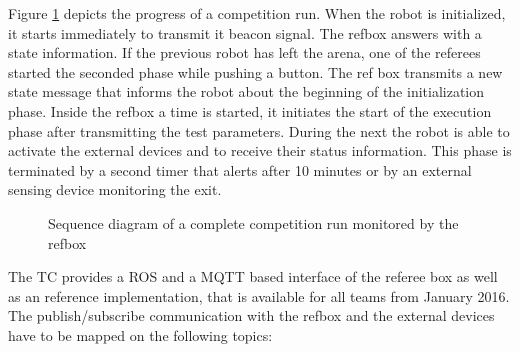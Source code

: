Figure \ref{fig:refbox} depicts the progress of a competition run. When the robot is initialized, it starts immediately to transmit it beacon signal. The refbox answers with a state information. If the previous robot has left the arena, one of the referees started the seconded phase while pushing a button. The ref box transmits a new state message that informs the robot about the beginning of the initialization phase. Inside the refbox a time is started, it initiates the start of the execution phase after transmitting the test parameters. During the next  the robot is able to activate the external devices and to receive their status information. This phase is terminated by a second timer that alerts after 10 minutes or by an external sensing device monitoring the exit.

\begin{figure}
\centering

\caption{Sequence diagram of a complete competition run monitored by the refbox}
\label{fig:refbox}
\end{figure}
\par
The TC provides a ROS and a MQTT based interface of the referee box as well as an reference implementation, that is available for all teams from January 2016.
The publish/subscribe communication with the refbox and the external devices have to be mapped on the following topics:

